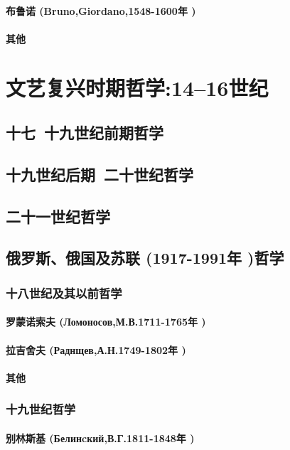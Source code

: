 \documentclass[UTF8]{../RepresentationUniverse}
\begin{document}
    \paragraph{布鲁诺 (Bruno,Giordano,1548-1600年 )}
    \paragraph{其他}

    

\section{文艺复兴时期哲学:14–16世纪}

\subsection{十七~十九世纪前期哲学}
\subsection{十九世纪后期~二十世纪哲学}
\subsection{二十一世纪哲学}

\subsection{俄罗斯、俄国及苏联 (1917-1991年 )哲学}
\subsubsection{十八世纪及其以前哲学}
    \paragraph{罗蒙诺索夫 (Ломоносов,М.В.1711-1765年 )}
    \paragraph{拉吉舍夫 (Раднщев,А.Н.1749-1802年 )}
    \paragraph{其他}
\subsubsection{十九世纪哲学}
    \paragraph{别林斯基 (Белинcкий,В.Г.1811-1848年 )}
\end{document}
